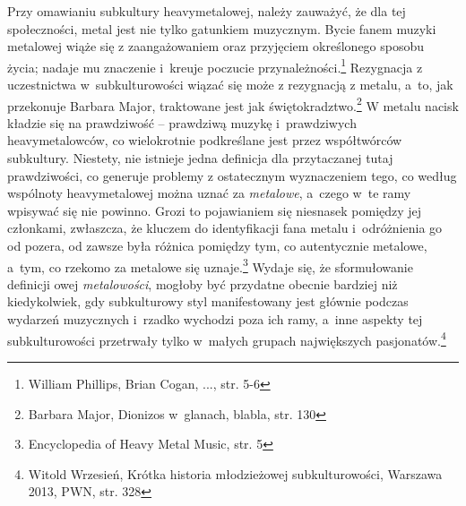 \documentclass[12pt, a4paper, titlepage]{report}
\begin{document}
Przy omawianiu subkultury heavymetalowej, należy zauważyć, że dla tej społeczności, metal jest nie tylko gatunkiem muzycznym. Bycie fanem muzyki metalowej wiąże się z zaangażowaniem oraz przyjęciem określonego sposobu życia; nadaje mu znaczenie i~kreuje poczucie przynależności.\footnote{William Phillips, Brian Cogan, ..., str. 5-6} Rezygnacja z uczestnictwa w~subkulturowości wiązać się może z rezygnacją z metalu, a~to, jak przekonuje Barbara Major, traktowane jest jak świętokradztwo.\footnote{Barbara Major, Dionizos w~glanach, blabla, str. 130} W metalu nacisk kładzie się na prawdziwość -- prawdziwą muzykę i~prawdziwych heavymetalowców, co wielokrotnie podkreślane jest przez współtwórców subkultury. Niestety, nie istnieje jedna definicja dla przytaczanej tutaj prawdziwości, co generuje problemy z ostatecznym wyznaczeniem tego, co według wspólnoty heavymetalowej można uznać za \emph{metalowe}, a~czego w~te ramy wpisywać się nie powinno. Grozi to pojawianiem się niesnasek pomiędzy jej członkami, zwłaszcza, że kluczem do identyfikacji fana metalu i~odróżnienia go od pozera, od zawsze była różnica pomiędzy tym, co autentycznie metalowe, a~tym, co rzekomo za metalowe się uznaje.\footnote{Encyclopedia of Heavy Metal Music, str. 5} Wydaje się, że sformułowanie definicji owej \emph{metalowości}, mogłoby być przydatne obecnie bardziej niż kiedykolwiek, gdy subkulturowy styl  manifestowany jest głównie podczas wydarzeń muzycznych i~rzadko wychodzi poza ich ramy, a~inne aspekty tej subkulturowości przetrwały tylko w~małych grupach największych pasjonatów.\footnote{Witold Wrzesień, Krótka historia młodzieżowej subkulturowości, Warszawa 2013, PWN, str. 328}
\end{document}

